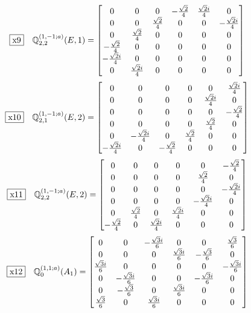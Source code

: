 \documentclass[fleqn,10pt,landscape]{jsarticle}
\begin{document}
\begin{dmath*}
\fbox{x9}\quad \mathbb{Q}_{2,2}^{(1,-1;a)}(E,1)=\begin{bmatrix} 0 & 0 & 0 & - \frac{\sqrt{2}}{4} & \frac{\sqrt{2} i}{4} & 0 \\ 0 & 0 & \frac{\sqrt{2}}{4} & 0 & 0 & - \frac{\sqrt{2} i}{4} \\ 0 & \frac{\sqrt{2}}{4} & 0 & 0 & 0 & 0 \\ - \frac{\sqrt{2}}{4} & 0 & 0 & 0 & 0 & 0 \\ - \frac{\sqrt{2} i}{4} & 0 & 0 & 0 & 0 & 0 \\ 0 & \frac{\sqrt{2} i}{4} & 0 & 0 & 0 & 0 \end{bmatrix}
\end{dmath*}
\begin{dmath*}
\fbox{x10}\quad \mathbb{Q}_{2,1}^{(1,-1;a)}(E,2)=\begin{bmatrix} 0 & 0 & 0 & 0 & 0 & \frac{\sqrt{2} i}{4} \\ 0 & 0 & 0 & 0 & \frac{\sqrt{2} i}{4} & 0 \\ 0 & 0 & 0 & 0 & 0 & - \frac{\sqrt{2}}{4} \\ 0 & 0 & 0 & 0 & \frac{\sqrt{2}}{4} & 0 \\ 0 & - \frac{\sqrt{2} i}{4} & 0 & \frac{\sqrt{2}}{4} & 0 & 0 \\ - \frac{\sqrt{2} i}{4} & 0 & - \frac{\sqrt{2}}{4} & 0 & 0 & 0 \end{bmatrix}
\end{dmath*}
\begin{dmath*}
\fbox{x11}\quad \mathbb{Q}_{2,2}^{(1,-1;a)}(E,2)=\begin{bmatrix} 0 & 0 & 0 & 0 & 0 & - \frac{\sqrt{2}}{4} \\ 0 & 0 & 0 & 0 & \frac{\sqrt{2}}{4} & 0 \\ 0 & 0 & 0 & 0 & 0 & - \frac{\sqrt{2} i}{4} \\ 0 & 0 & 0 & 0 & - \frac{\sqrt{2} i}{4} & 0 \\ 0 & \frac{\sqrt{2}}{4} & 0 & \frac{\sqrt{2} i}{4} & 0 & 0 \\ - \frac{\sqrt{2}}{4} & 0 & \frac{\sqrt{2} i}{4} & 0 & 0 & 0 \end{bmatrix}
\end{dmath*}
\begin{dmath*}
\fbox{x12}\quad \mathbb{Q}_{0}^{(1,1;a)}(A_{1})=\begin{bmatrix} 0 & 0 & - \frac{\sqrt{3} i}{6} & 0 & 0 & \frac{\sqrt{3}}{6} \\ 0 & 0 & 0 & \frac{\sqrt{3} i}{6} & - \frac{\sqrt{3}}{6} & 0 \\ \frac{\sqrt{3} i}{6} & 0 & 0 & 0 & 0 & - \frac{\sqrt{3} i}{6} \\ 0 & - \frac{\sqrt{3} i}{6} & 0 & 0 & - \frac{\sqrt{3} i}{6} & 0 \\ 0 & - \frac{\sqrt{3}}{6} & 0 & \frac{\sqrt{3} i}{6} & 0 & 0 \\ \frac{\sqrt{3}}{6} & 0 & \frac{\sqrt{3} i}{6} & 0 & 0 & 0 \end{bmatrix}
\end{dmath*}
\end{document}

